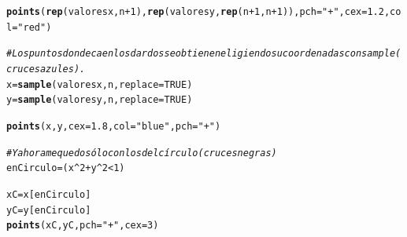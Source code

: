 \documentclass[10pt,a4paper]{article}\usepackage[]{graphicx}\usepackage[]{color}
\makeatletter
\newcommand{\hlnum}[1]{\textcolor[rgb]{0.686,0.059,0.569}{#1}}%
\newcommand{\hlstr}[1]{\textcolor[rgb]{0.192,0.494,0.8}{#1}}%
\newcommand{\hlcom}[1]{\textcolor[rgb]{0.678,0.584,0.686}{\textit{#1}}}%
\newcommand{\hlopt}[1]{\textcolor[rgb]{0,0,0}{#1}}%
\newcommand{\hlstd}[1]{\textcolor[rgb]{0.345,0.345,0.345}{#1}}%
\newcommand{\hlkwb}[1]{\textcolor[rgb]{0.69,0.353,0.396}{#1}}%
\newcommand{\hlkwc}[1]{\textcolor[rgb]{0.333,0.667,0.333}{#1}}%
\newcommand{\hlkwd}[1]{\textcolor[rgb]{0.737,0.353,0.396}{\textbf{#1}}}%
\newenvironment{kframe}{%
 \def\at@end@of@kframe{}%
 \ifinner\ifhmode%
  \def\at@end@of@kframe{\end{minipage}}%
  \begin{minipage}{\columnwidth}%
 \fi\fi%
 \def\FrameCommand##1{\hskip\@totalleftmargin \hskip-\fboxsep
 \colorbox{shadecolor}{##1}\hskip-\fboxsep
     \hskip-\linewidth \hskip-\@totalleftmargin \hskip\columnwidth}%
 \MakeFramed {\advance\hsize-\width
   \@totalleftmargin\z@ \linewidth\hsize
   \@setminipage}}%
 {\par\unskip\endMakeFramed%
 \at@end@of@kframe}
\newenvironment{knitrout}{}{} %
\makeatother
\begin{document}
\begin{enumerate}
\begin{knitrout}
\begin{kframe}
\begin{alltt}
\hlkwd{points}\hlstd{(}\hlkwd{rep}\hlstd{(valoresx,n}\hlopt{+}\hlnum{1}\hlstd{),}\hlkwd{rep}\hlstd{(valoresy,} \hlkwd{rep}\hlstd{(n}\hlopt{+}\hlnum{1}\hlstd{,n}\hlopt{+}\hlnum{1}\hlstd{)),} \hlkwc{pch}\hlstd{=}\hlstr{"+"}\hlstd{,} \hlkwc{cex}\hlstd{=}\hlnum{1.2}\hlstd{,} \hlkwc{col}\hlstd{=}\hlstr{"red"}\hlstd{)}


\hlcom{# Los puntos donde caen los dardos se obtienen eligiendo su coordenadas con sample (cruces azules).}
\hlstd{x} \hlkwb{=} \hlkwd{sample}\hlstd{(valoresx, n,} \hlkwc{replace} \hlstd{=} \hlnum{TRUE}\hlstd{)}
\hlstd{y} \hlkwb{=} \hlkwd{sample}\hlstd{(valoresy, n,} \hlkwc{replace} \hlstd{=} \hlnum{TRUE}\hlstd{)}

\hlkwd{points}\hlstd{(x,y,} \hlkwc{cex}\hlstd{=}\hlnum{1.8}\hlstd{,} \hlkwc{col}\hlstd{=}\hlstr{"blue"}\hlstd{,} \hlkwc{pch}\hlstd{=}\hlstr{"+"}\hlstd{)}

\hlcom{# Y ahora me quedo sólo con los del círculo (cruces negras)}
\hlstd{enCirculo} \hlkwb{=} \hlstd{( x}\hlopt{^}\hlnum{2} \hlopt{+} \hlstd{y}\hlopt{^}\hlnum{2} \hlopt{<} \hlnum{1}\hlstd{)}

\hlstd{xC} \hlkwb{=} \hlstd{x[enCirculo]}
\hlstd{yC} \hlkwb{=} \hlstd{y[enCirculo]}
\hlkwd{points}\hlstd{(xC,yC,} \hlkwc{pch} \hlstd{=} \hlstr{"+"}\hlstd{,} \hlkwc{cex}\hlstd{=}\hlnum{3}\hlstd{)}


\end{alltt}
\end{kframe}
\end{knitrout}
\end{enumerate}
\end{document}
